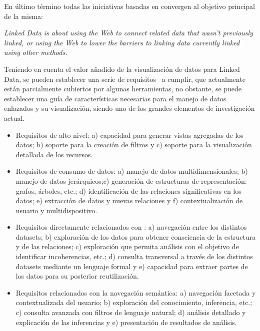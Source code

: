 En último término todas las iniciativas basadas en \linkeddata convergen al objetivo principal de la misma:
\begin{Frame}
\textit{Linked Data is about using the Web to connect related data that wasn't previously linked, or using the Web to lower the barriers 
to linking data currently linked using other methods.} 
\end{Frame}


Teniendo en cuenta el valor añadido de la visualización de datos para Linked Data,
 se pueden establecer una serie de requisitos~\cite{journals/semweb/DadzieR11} a cumplir, que actualmente están parcialmente cubiertos 
por algunas herramientas, no obstante, se puede establecer una guía de características necesarias para el manejo de datos enlazados y su 
visualización, siendo uno de los grandes elementos de investigación actual.
\begin{itemize}
 \item Requisitos de alto nivel: a) capacidad para generar vistas agregadas de los datos; b) soporte para la creación de filtros y c) soporte para 
la visualización detallada de los recursos.
\item  Requisitos de consumo de datos: a) manejo de datos multidimensionales; b) manejo de datos jerárquicos;c) generación de estructuras de representación: grafos, árboles, etc.; d) identificación de las relaciones significativas en los datos;
e) extracción de datos y nuevas relaciones y f) contextualización de usuario y multidispositivo.
\item Requisitos directamente relacionados con \linkeddata: a) navegación entre los distintos datasets; b) exploración de los datos 
para obtener consciencia de la estructura y de las relaciones; \linebreak c) exploración que permita análisis con el objetivo de identificar incoherencias, etc.;
d) consulta transversal a través de los distintos datasets mediante un lenguaje formal y e) capacidad para extraer partes de los datos para su posterior reutilización.
\item Requisitos relacionados con la navegación semántica: a) navegación facetada y contextualizada del usuario; b) exploración del conocimiento, inferencia, etc.;
c) consulta avanzada con filtros de lenguaje natural; d) análisis detallado y explicación de las inferencias y e) presentación de resultados de análisis.
\end{itemize}




